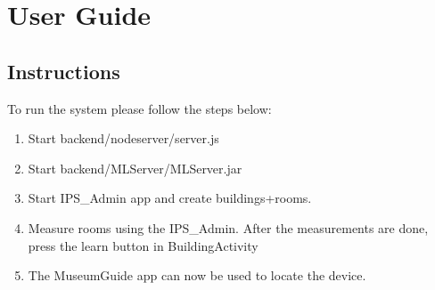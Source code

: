 \chapter{User Guide}
\section{Instructions}
To run the system please follow the steps below:
\begin{enumerate}
\item Start backend/nodeserver/server.js
\item Start backend/MLServer/MLServer.jar
\item Start IPS\_Admin app and create buildings+rooms.
\item Measure rooms using the IPS\_Admin. After the measurements are done, press the learn button in BuildingActivity
\item The MuseumGuide app can now be used to locate the device.
\end{enumerate}